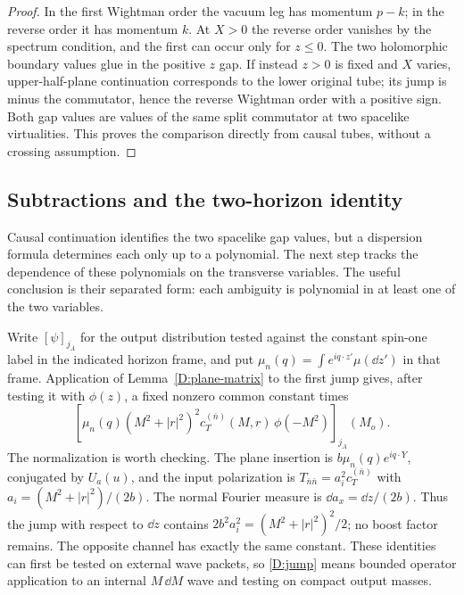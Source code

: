 \begin{proof}
In the first Wightman order the vacuum leg has momentum $p-k$;
in the reverse order it has momentum $k$.  At $X>0$ the reverse
order vanishes by the spectrum condition, and the first can occur
only for $z\leq0$.  The two holomorphic boundary values glue in
the positive $z$ gap.  If instead $z>0$ is fixed and $X$ varies,
upper-half-plane continuation corresponds to the lower original
tube; its jump is minus the commutator, hence the reverse Wightman
order with a positive sign.  Both gap values are values of the
same split commutator at two spacelike virtualities.  This proves
the comparison directly from causal tubes, without a crossing
assumption.
\end{proof}

\subsection{Subtractions and the two-horizon identity}

Causal continuation identifies the two spacelike gap values, but a
dispersion formula determines each only up to a polynomial.  The next
step tracks the dependence of these polynomials on the transverse
variables.  The useful conclusion is their separated form: each
ambiguity is polynomial in at least one of the two variables.

Write $[\psi]_{j_A}$ for the output distribution tested against the
constant spin-one label in the indicated horizon frame, and put
$\mu_n(q)=\int e^{iq\cdot z'}\mu(\dd z')$ in that frame.
Application of Lemma~\ref{D:plane-matrix} to the first jump gives,
after testing it with $\phi(z)$, a fixed nonzero common constant times
\begin{equation}\label{D:jump}
 \left[\mu_n(q)(M^2+|r|^2)^2
 c_T^{(\bar n)}(M,r)\,\phi(-M^2)\right]_{j_A}(M_o).
\end{equation}
The normalization is worth checking.  The plane insertion is
$b\mu_n(q)e^{iq\cdot Y}$, conjugated by $U_a(u)$, and the input
polarization is $T_{\bar n\bar n}=a_i^2c_T^{(\bar n)}$ with
$a_i=(M^2+|r|^2)/(2b)$.  The normal Fourier measure is
$\dd a_x=\dd z/(2b)$.  Thus the jump with respect to $\dd z$
contains $2b^2a_i^2=(M^2+|r|^2)^2/2$; no boost factor remains.
The opposite channel has exactly the same constant.  These
identities can first be tested on external wave packets, so
\eqref{D:jump} means bounded operator application to an internal
$M\,\dd M$ wave and testing on compact output masses.

